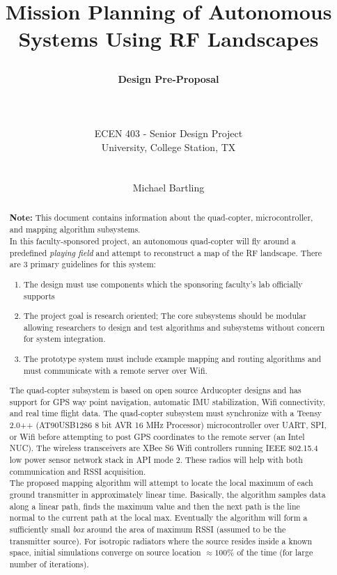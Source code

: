 \documentclass[11pt,letterpaper,titlepage]{article}
\author{
\begin{LARGE}
\textbf{Design Pre-Proposal} 
\end{LARGE}\\
\mytoday \\ \\
ECEN 403 - Senior Design Project\\
\TAMU University, College Station, TX \\ \\
\teamno\\ 
Michael Bartling \\
}
\title{
\begin{LARGE}
\textbf{Mission Planning of Autonomous Systems Using RF Landscapes}
\end{LARGE}
}
\begin{document}
\maketitle

\begin{abstract}
\textbf{Note:} This document contains information about the quad-copter, microcontroller, and mapping algorithm subsystems.\\

\noindent
In this faculty-sponsored project, an autonomous quad-copter will fly around a predefined \textit{playing field} and attempt to reconstruct a map of the RF landscape. There are 3 primary guidelines for this system: 
\begin{enumerate}
\item The design must use components which the sponsoring faculty's lab officially supports\cite{arducopter_ref}\cite{teensy_ref}\cite{xbee_ref}\cite{nuc_ref} 
\item The project goal is research oriented; The core subsystems should be modular allowing researchers to design and test algorithms and subsystems without concern for system integration.
\item The prototype system must include example mapping and routing algorithms and must communicate with a remote server over Wifi.
\end{enumerate}

\noindent
The quad-copter subsystem is based on open source Arducopter\cite{arducopter_ref} designs and has  support for GPS way point navigation, automatic IMU stabilization, Wifi connectivity, and real time flight data. The quad-copter subsystem must synchronize with a Teensy 2.0++ (AT90USB1286 8 bit AVR 16 MHz Processor) microcontroller \cite{teensy_ref} over UART, SPI, or Wifi before attempting to post GPS coordinates to the remote server (an Intel NUC\cite{nuc_ref}). The wireless transceivers are XBee S6 Wifi controllers running IEEE 802.15.4 low power sensor network stack in API mode 2. These radios will help with both communication and RSSI acquisition.\\ 

\noindent
The proposed mapping algorithm will attempt to locate the local maximum of each ground transmitter in approximately linear time. Basically, the algorithm samples data along a linear path, finds the maximum value and then the next path is the line normal to the current path at the local max. Eventually the algorithm will form a sufficiently small \textit{box} around the area of maximum RSSI (assumed to be the transmitter source). For isotropic radiators where the source resides inside a known space, initial simulations converge on source location $\approx 100\%$ of the time (for large number of iterations).  






\end{abstract}
\end{document}
